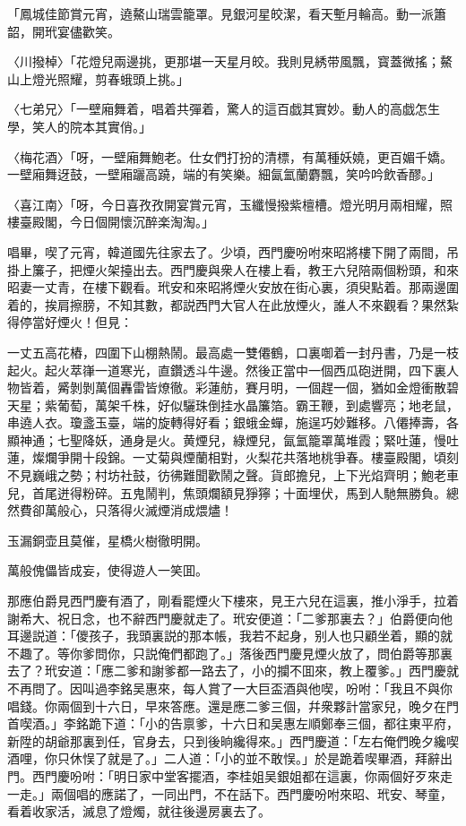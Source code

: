 「鳳城佳節賞元宵，遶鰲山瑞雲籠罩。見銀河星皎潔，看天塹月輪高。動一派簫韶，開玳宴儘歡笑。

〈川撥棹〉「花燈兒兩邊挑，更那堪一天星月皎。我則見綉带風飄，寳蓋微搖；鰲山上燈光照耀，剪春蛾頭上挑。」

〈七弟兄〉「一壁廂舞着，唱着共彈着，驚人的這百戯其實妙。動人的高戯怎生學，笑人的院本其實俏。」

〈梅花酒〉「呀，一壁廂舞鮑老。仕女們打扮的清標，有萬種妖嬈，更百媚千嬌。一壁廂舞迓鼓，一壁廂躧高蹺，端的有笑樂。細氤氳蘭麝飄，笑吟吟飲香醪。」

〈喜江南〉「呀，今日喜孜孜開宴賞元宵，玉纖慢撥紫檀槽。燈光明月兩相耀，照樓臺殿閣，今日個開懷沉醉楽淘淘。」

唱畢，喫了元宵，韓道國先往家去了。少頃，西門慶吩咐來昭將樓下開了兩間，吊掛上簾子，把煙火架擡出去。西門慶與衆人在樓上看，教王六兒陪兩個粉頭，和來昭妻一丈青，在樓下觀看。玳安和來昭將煙火安放在街心裏，須臾點着。那兩邊圍着的，挨肩擦膀，不知其數，都説西門大官人在此放煙火，誰人不來觀看？果然紮得停當好煙火！但見：

一丈五高花樁，四圍下山棚熱鬧。最高處一雙僊鶴，口裏啣着一封丹書，乃是一枝起火。起火萃嵂一道寒光，直鑽透斗牛邊。然後正當中一個西瓜砲迸開，四下裏人物皆着，觱剝剝萬個轟雷皆燎徹。彩蓮舫，賽月明，一個趕一個，猶如金燈衝散碧天星；紫葡萄，萬架千株，好似驪珠倒挂水晶簾箔。霸王鞭，到處響亮；地老鼠，串遶人衣。瓊盞玉臺，端的旋轉得好看；銀蛾金蟬，施逞巧妙難移。八僊捧壽，各顯神通；七聖降妖，通身是火。黄煙兒，綠煙兒，氤氳籠罩萬堆霞；緊吐蓮，慢吐蓮，燦爛爭開十段錦。一丈菊與煙蘭相對，火梨花共落地桃爭春。樓臺殿閣，頃刻不見巍峨之勢；村坊社鼓，彷彿難聞歡鬧之聲。貨郎擔兒，上下光焰齊明；鮑老車兒，首尾迸得粉碎。五鬼鬧判，焦頭爛額見猙獰；十面埋伏，馬到人馳無勝負。總然費卻萬般心，只落得火滅煙消成煨燼！

玉漏銅壶且莫催，星橋火樹徹明開。

萬般傀儡皆成妄，使得遊人一笑囬。

那應伯爵見西門慶有酒了，剛看罷煙火下樓來，見王六兒在這裏，推小淨手，拉着謝希大、祝日念，也不辭西門慶就走了。玳安便道：「二爹那裏去？」伯爵便向他耳邊説道：「儍孩子，我頭裏説的那本帳，我若不起身，别人也只顧坐着，顯的就不趣了。等你爹問你，只説俺們都跑了。」落後西門慶見煙火放了，問伯爵等那裏去了？玳安道：「應二爹和謝爹都一路去了，小的攔不囬來，教上覆爹。」西門慶就不再問了。因叫過李銘吴惠來，每人賞了一大巨盃酒與他喫，吩咐：「我且不與你唱錢。你兩個到十六日，早來答應。還是應二爹三個，幷衆夥計當家兒，晚夕在門首喫酒。」李銘跪下道：「小的告禀爹，十六日和吴惠左順鄭奉三個，都往東平府，新陞的胡爺那裏到任，官身去，只到後晌纔得來。」西門慶道：「左右俺們晚夕纔喫酒哩，你只休悮了就是了。」二人道：「小的並不敢悮。」於是跪着喫畢酒，拜辭出門。西門慶吩咐：「明日家中堂客擺酒，李桂姐吴銀姐都在這裏，你兩個好歹來走一走。」兩個唱的應諾了，一同出門，不在話下。西門慶吩咐來昭、玳安、琴童，看着收家活，滅息了燈燭，就往後邊房裏去了。

